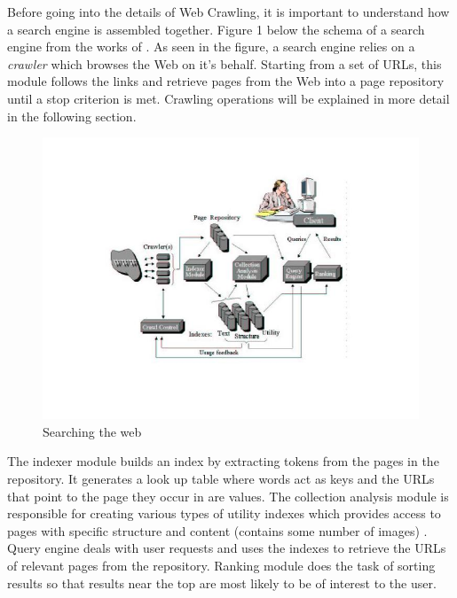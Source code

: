 \documentclass[a4paper, 11pt]{article} %
\begin{document}
Before going into the details of Web Crawling, it is important to understand how a search engine is assembled together. Figure 1 below the schema of a search engine from the works of \cite{arasu2001searching}. As seen in the figure, a search engine relies on a \textit{crawler} which browses the Web on it's behalf. Starting from a set of URLs, this module follows the links and retrieve pages from the Web into a page repository until a stop criterion is met. Crawling operations will be explained in more detail in the following section. \\

\begin{figure} %
\begin{center}
\includegraphics[width=1\textwidth]{searchengine.jpg}
\end{center}
\caption{Searching the web}
\end{figure}

The indexer module builds an index by extracting tokens from the pages in the repository. It generates a look up table where words act as keys and the URLs that point to the page they occur in are values. The collection analysis module is responsible for creating various types of utility indexes which provides access to pages with specific structure and content (contains some number of images) \cite{arasu2001searching}. Query engine deals with user requests and uses the indexes to retrieve the URLs of relevant pages from the repository. Ranking module does the task of sorting results so that results near the top are most likely to be of interest to the user. \\
\end{document}

